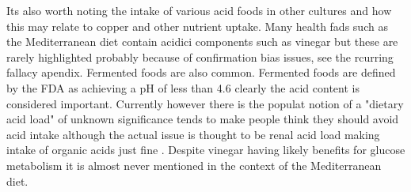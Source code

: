 Its also worth noting the intake of various acid foods in other
cultures and how this may relate to copper and other nutrient uptake.
Many health fads such as the Mediterranean diet contain acidici components
such as vinegar but these are rarely highlighted probably because of
confirmation bias issues, see the rcurring fallacy apendix.
Fermented foods are also common. 
Fermented foods are defined by the FDA as achieving a pH of less than 
4.6 
\cite{Caffrey_Perelman_Ward_Unpacking_Food_Fermentation_Clinically_2025}
 clearly the acid content is considered important.
Currently however there is the populat notion of a 
 "dietary acid load" of unknown significance tends to make people think they should avoid acid intake although the actual issue is thought to be renal
acid load making intake of organic acids just fine  \cite{PMC11006742}.
Despite vinegar having likely  benefits for glucose metabolism
\cite{Santos_deMoraes_daSilva_Vinegar_acetic_acid_intake_2019}
it is almost never mentioned in the context of the Mediterranean diet.




